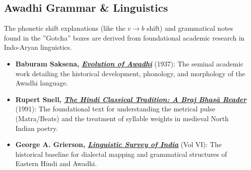 \subsection*{Awadhi Grammar \& Linguistics}
The phonetic shift explanations (like the \(v \rightarrow b\) shift) and grammatical notes found in the ''Gotcha'' boxes are derived from foundational academic research in Indo-Aryan linguistics.
\begin{itemize}
    \item \textbf{Baburam Saksena, \href{https://archive.org/details/in.ernet.dli.2015.238311/mode/2up}{\textit{Evolution of Awadhi}}} (1937): The seminal academic work detailing the historical development, phonology, and morphology of the Awadhi language.
    \item \textbf{Rupert Snell, \href{https://ia600500.us.archive.org/16/items/Pushtimarg/BrajBhashaReaderenglish.pdf}{\textit{The Hindi Classical Tradition: A Braj Bhas\={a} Reader}}} (1991): The foundational text for understanding the metrical pulse (Matra/Beats) and the treatment of syllable weights in medieval North Indian poetry.
    \item \textbf{George A. Grierson, \href{https://dsal.uchicago.edu/books/lsi/lsi.php?volume=6&pages=286}{\textit{Linguistic Survey of India}}} (Vol VI): The historical baseline for dialectal mapping and grammatical structures of Eastern Hindi and Awadhi.
\end{itemize}
